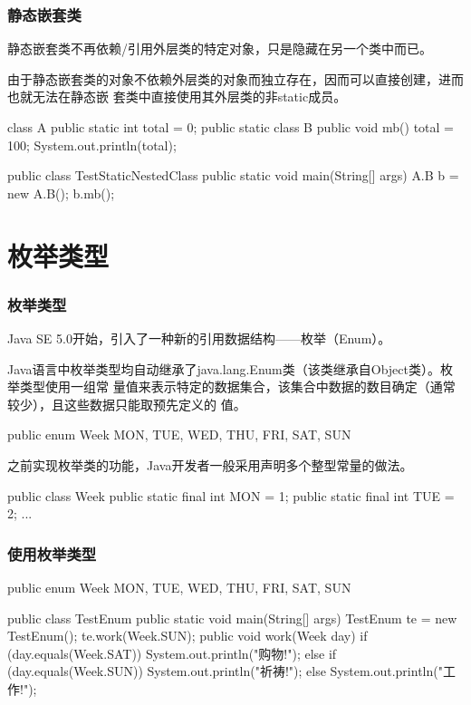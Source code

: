 \begin{frame}[fragile] %
\frametitle{静态嵌套类}

{\hei 静态嵌套类不再依赖/引用外层类的特定对象，只是隐藏在另一个类中而已。}

由于静态嵌套类的对象不依赖外层类的对象而独立存在，因而可以直接创建，进而也就无法在静态嵌
套类中直接使用其外层类的非static成员。
\begin{javaCode}
class A {
  public static int total = 0;
  public static class B {
    public void mb() {
      total = 100;
      System.out.println(total);
    }
  }
}  

public class TestStaticNestedClass {
  public static void main(String[] args) {
    A.B b = new A.B();
    b.mb();
  }
}
\end{javaCode}
\end{frame}

\section{枚举类型}
\begin{frame}[fragile] %
\frametitle{枚举类型}

{\hei Java SE 5.0开始，引入了一种新的引用数据结构——枚举（Enum）。}

{\kai Java语言中枚举类型均自动继承了java.lang.Enum类（该类继承自Object类）。枚举类型使用一组常
量值来表示特定的数据集合，该集合中数据的数目确定（通常较少），且这些数据只能取预先定义的
值。}

\begin{javaCode}
public enum Week {
  MON, TUE, WED, THU, FRI, SAT, SUN
}
\end{javaCode}


之前实现枚举类的功能，Java开发者一般采用声明多个整型常量的做法。

\begin{javaCode}
public class Week {
  public static final int MON = 1;
  public static final int TUE = 2;
  ...
}    
\end{javaCode}
\end{frame}

\begin{frame}[fragile] %
\frametitle{使用枚举类型}
\begin{javaCode}
public enum Week {
  MON, TUE, WED, THU, FRI, SAT, SUN
}  
\end{javaCode}
\begin{javaCode}
public class TestEnum {
  public static void main(String[] args) {
    TestEnum te = new TestEnum();
    te.work(Week.SUN);
  }
  public void work(Week day) {
    if (day.equals(Week.SAT)) {
      System.out.println("购物!");
    }else if (day.equals(Week.SUN)) {
      System.out.println("祈祷!");
    } else {
      System.out.println("工作!");
    }
  }
}
\end{javaCode}
\end{frame}

